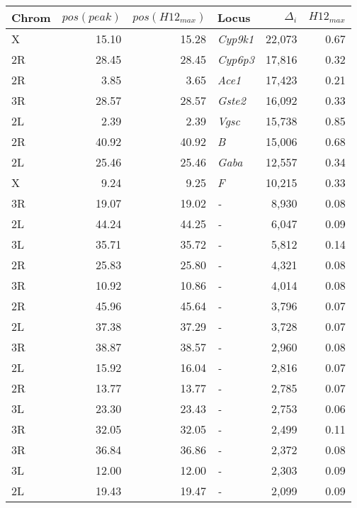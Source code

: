 \begin{tabular}{lrrlrr}
\toprule
Chrom & $pos(peak)$ & $pos(H12_{max})$ &            Locus & $\Delta_{i}$ & $H12_{max}$ \\
\midrule
    X &       15.10 &            15.28 &  \textit{Cyp9k1} &       22,073 &        0.67 \\
   2R &       28.45 &            28.45 &  \textit{Cyp6p3} &       17,816 &        0.32 \\
   2R &        3.85 &             3.65 &    \textit{Ace1} &       17,423 &        0.21 \\
   3R &       28.57 &            28.57 &   \textit{Gste2} &       16,092 &        0.33 \\
   2L &        2.39 &             2.39 &    \textit{Vgsc} &       15,738 &        0.85 \\
   2R &       40.92 &            40.92 &       \textit{B} &       15,006 &        0.68 \\
   2L &       25.46 &            25.46 &    \textit{Gaba} &       12,557 &        0.34 \\
    X &        9.24 &             9.25 &       \textit{F} &       10,215 &        0.33 \\
   3R &       19.07 &            19.02 &       \textit{-} &        8,930 &        0.08 \\
   2L &       44.24 &            44.25 &       \textit{-} &        6,047 &        0.09 \\
   3L &       35.71 &            35.72 &       \textit{-} &        5,812 &        0.14 \\
   2R &       25.83 &            25.80 &       \textit{-} &        4,321 &        0.08 \\
   3R &       10.92 &            10.86 &       \textit{-} &        4,014 &        0.08 \\
   2R &       45.96 &            45.64 &       \textit{-} &        3,796 &        0.07 \\
   2L &       37.38 &            37.29 &       \textit{-} &        3,728 &        0.07 \\
   3R &       38.87 &            38.57 &       \textit{-} &        2,960 &        0.08 \\
   2L &       15.92 &            16.04 &       \textit{-} &        2,816 &        0.07 \\
   2R &       13.77 &            13.77 &       \textit{-} &        2,785 &        0.07 \\
   3L &       23.30 &            23.43 &       \textit{-} &        2,753 &        0.06 \\
   3R &       32.05 &            32.05 &       \textit{-} &        2,499 &        0.11 \\
   3R &       36.84 &            36.86 &       \textit{-} &        2,372 &        0.08 \\
   3L &       12.00 &            12.00 &       \textit{-} &        2,303 &        0.09 \\
   2L &       19.43 &            19.47 &       \textit{-} &        2,099 &        0.09 \\
\bottomrule
\end{tabular}
